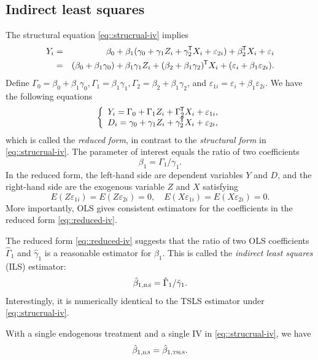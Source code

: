 \subsection{Indirect least squares}


The structural equation \eqref{eq::strucrual-iv} implies 
\begin{eqnarray*}
Y_i &=&\beta_0 + \beta_1 (\gamma_0 + \gamma_1 Z_i + \gamma_2 ^{\mkern-1.5mu\mathsf{T}} X_i + \varepsilon_{2i}) + \beta_2^{\mkern-1.5mu\mathsf{T}} X_i + \varepsilon_{i} \\
&=& (\beta_0 + \beta_1\gamma_0 ) + \beta_1  \gamma_1 Z_i  + ( \beta_2 + \beta_1 \gamma_2 )^{\mkern-1.5mu\mathsf{T}} X_i  + ( \varepsilon_{i} + \beta_1 \varepsilon_{2i} ).
\end{eqnarray*}
Define $\Gamma_0 = \beta_0 + \beta_1\gamma_0, \Gamma_1  =  \beta_1  \gamma_1, \Gamma_2 = \beta_2 + \beta_1 \gamma_2$, and $\varepsilon_{1i} = \varepsilon_{i} + \beta_1 \varepsilon_{2i}$. We have the following equations
\begin{eqnarray}
\label{eq::reduced-iv}
\left\{
\begin{array}{l}
Y_i =\Gamma_0 + \Gamma_1 Z_i + \Gamma_2\tran X_i + \varepsilon_{1i},\\
D_i = \gamma_0 + \gamma_1 Z_i + \gamma_2 \tran X_i + \varepsilon_{2i},
\end{array}
\right.
\end{eqnarray}
which is called the {\it reduced form}, in contrast to the {\it structural form} in \eqref{eq::strucrual-iv}. The parameter of interest equals the ratio of two coefficients 
$$
\beta_1 = \Gamma_1 / \gamma_1.
$$ 
In the reduced form, the left-hand side are dependent variables $Y$ and $D$, and the right-hand side are the exogenous variable $Z$ and $X$ satisfying 
$$
E( Z \varepsilon_{1i} ) = E( Z \varepsilon_{2i} )  = 0, \quad 
E( X \varepsilon_{1i} ) = E( X \varepsilon_{2i} )  = 0.
$$ 
More importantly, OLS gives consistent estimators for the coefficients in the reduced form \eqref{eq::reduced-iv}. 


The reduced form \eqref{eq::reduced-iv} suggests that the ratio of two OLS coefficients $\hat{\Gamma}_1$ and $\hat{\gamma}_1$ is a reasonable estimator for $\beta_1$. This is called the {\it indirect least squares} (ILS) estimator:
$$
\hat{\beta}_{1,\textsc{ils}} =  \hat{\Gamma}_1 / \hat{\gamma}_1 .
$$
Interestingly, it is numerically identical to the TSLS estimator under \eqref{eq::strucrual-iv}.

\begin{theorem}
\label{thm::ils=2sls}
With a single endogenous treatment and a single IV in \eqref{eq::strucrual-iv}, we have 
$$
\hat{\beta}_{1,\textsc{ils}}   = \hat{\beta}_{1,\textsc{tsls}} . 
$$
\end{theorem}

